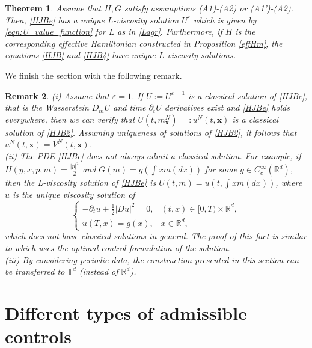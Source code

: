 \documentclass[reqno,11pt]{amsart}
\newtheorem{theorem}{Theorem}[section]
\newtheorem{remark}[theorem]{Remark}
\numberwithin{equation}{section}
\newcommand{\be}{\begin{equation}}
\newcommand{\ee}{\end{equation}}
\newcommand{\R}{\mathbb{R}} %
\newcommand{\e}{\varepsilon}
\newcommand{\T}{\mathbb{T}}
\newcommand{\nd}{\noindent}
\begin{document}
\begin{theorem}\label{comprep}
    Assume that $H,G$ satisfy assumptions (A1)-(A2) or (A1')-(A2). Then, \eqref{HJBe} has a unique $L$-viscosity solution $U^\e$ which is given by \eqref{eqn:U_value_function} for $L$ as in \eqref{Lagr}. Furthermore, if $\overline{H}$ is the corresponding effective Hamiltonian constructed in Proposition \ref{effHm}, the equations \eqref{HJB} and \eqref{HJB4} have unique $L$-viscosity solutions.
\end{theorem}

\nd
We finish the section with the following remark.

\begin{remark}\label{rem1}
    (i) Assume that $\e=1$. If $U:=U^{\e=1}$ is a classical solution of \eqref{HJBe}, that is the Wasserstein $D_mU$ and time $\partial_tU$ derivatives exist and \eqref{HJBe} holds everywhere, then we can verify that $U(t,m_{\bm x}^N)=:u^N(t,\bm x)$ is a classical solution of \eqref{HJB2}. Assuming uniqueness of solutions of \eqref{HJB2}, it follows that $u^N(t,\bm x)=V^N(t,\bm x)$.
    \\[0.5ex]
    (ii) The PDE \eqref{HJBe} does not always admit a classical solution. For example, if $H(y,x,p,m)=\frac{|p|^2}{2}$ and $G(m)=g(\int x m(dx))$ for some $g\in C^\infty_c(\R^d)$, then the L-viscosity solution of \eqref{HJBe} is $U(t,m)= u(t, \int x m(dx))$, where $u$ is the unique viscosity solution of
    \be\nonumber
    \begin{cases}
        -\partial_t u +\frac{1}{2}|Du|^2=0, &(t,x)\in [0,T)\times \R^d,\\
        u(T,x)=g(x), &x\in \R^d,
    \end{cases}
    \ee
    which does not have classical solutions in general. The proof of this fact is similar to \cite[Proposition 2.10]{daudin2024optimal} which uses the optimal control formulation of the solution. \\[0.5ex]
(iii) By considering periodic data, the construction presented in this section can be transferred to $\T^d$ (instead of $\R^d$).
\end{remark}

\section{Different types of admissible controls}
\label{section4}
\end{document}

